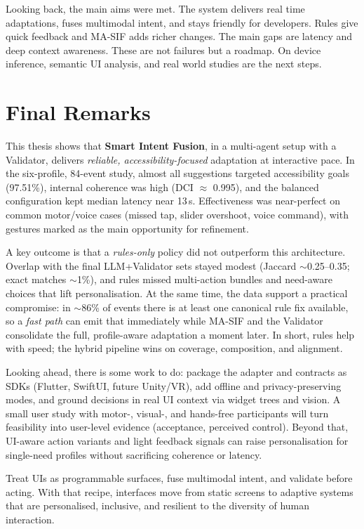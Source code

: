 Looking back, the main aims were met. The system delivers real time adaptations, fuses multimodal intent, and stays friendly for developers. Rules give quick feedback and MA-SIF adds richer changes. The main gaps are latency and deep context awareness. These are not failures but a roadmap. On device inference, semantic UI analysis, and real world studies are the next steps.

\section{Final Remarks}
This thesis shows that \textbf{Smart Intent Fusion}, in a multi-agent setup with a Validator, delivers \emph{reliable, accessibility-focused} adaptation at interactive pace. In the six-profile, 84-event study, almost all suggestions targeted accessibility goals (97.51\%), internal coherence was high (DCI $\approx$ 0.995), and the balanced configuration kept median latency near 13\,s. Effectiveness was near-perfect on common motor/voice cases (missed tap, slider overshoot, voice command), with gestures marked as the main opportunity for refinement.

A key outcome is that a \emph{rules-only} policy did not outperform this architecture. Overlap with the final LLM+Validator sets stayed modest (Jaccard $\sim$0.25–0.35; exact matches $\sim$1\%), and rules missed multi-action bundles and need-aware choices that lift personalisation. At the same time, the data support a practical compromise: in $\sim$86\% of events there is at least one canonical rule fix available, so a \emph{fast path} can emit that immediately while MA-SIF and the Validator consolidate the full, profile-aware adaptation a moment later. In short, rules help with speed; the hybrid pipeline wins on coverage, composition, and alignment.

Looking ahead, there is some work to do: package the adapter and contracts as SDKs (Flutter, SwiftUI, future Unity/VR), add offline and privacy-preserving modes, and ground decisions in real UI context via widget trees and vision. A small user study with motor-, visual-, and hands-free participants will turn feasibility into user-level evidence (acceptance, perceived control). Beyond that, UI-aware action variants and light feedback signals can raise personalisation for single-need profiles without sacrificing coherence or latency.

Treat UIs as programmable surfaces, fuse multimodal intent, and validate before acting. With that recipe, interfaces move from static screens to adaptive systems that are personalised, inclusive, and resilient to the diversity of human interaction.